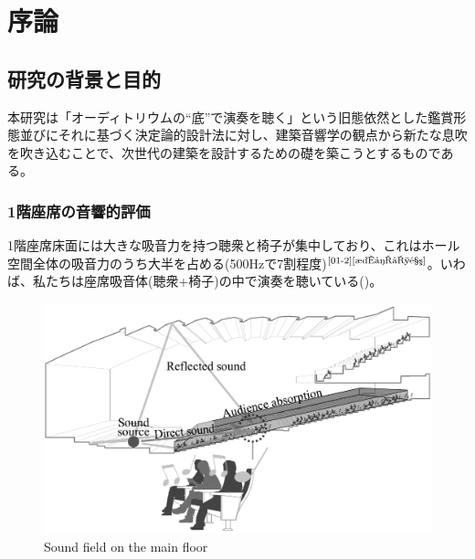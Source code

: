\chapter{序論}
\thispagestyle{fancy}
\nobreak
\section{研究の背景と目的}
本研究は「オーディトリウムの“底”で演奏を聴く」という旧態依然とした鑑賞形態並びにそれに基づく決定論的設計法に対し、建築音響学の観点から新たな息吹を吹き込むことで、次世代の建築を設計するための礎を築こうとするものである。

\subsection{1階座席の音響的評価}
1階座席床面には大きな吸音力を持つ聴衆と椅子が集中しており、これはホール空間全体の吸音力のうち大半を占める(500Hzで7割程度)$^{\text{\cite{01-2}{\cite{椅子吸音}}}}$。いわば、私たちは座席吸音体(聴衆+椅子)の中で演奏を聴いている()。

\begin{figure}[h]
    \centering
    \includegraphics[keepaspectratio,scale=0.6]{01_att/1stfloor.pdf}
    \caption{\hspace{1mm}Sound field on the main floor}
    \label{fig:1stfloor}
\end{figure}

\clearpage
